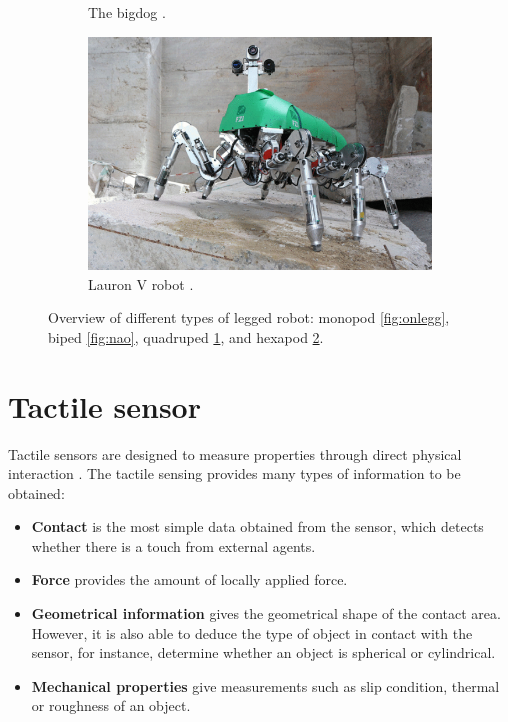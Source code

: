 \documentclass[USenglish]{ifimaster}  %
\begin{document}
\begin{figure}
\begin{subfigure}[b]{0.22\textwidth}
		\caption{The bigdog \cite{Raibert200810822}.}
		\label{fig:bigDog}
	\end{subfigure}\hfill
	\begin{subfigure}[b]{0.22\textwidth}
		\centering
		\includegraphics[width=\linewidth]{Figures/Lauron}
		\caption{Lauron V robot \cite{6878051}.}
		\label{fig:LAURON}
	\end{subfigure}
	\caption[Overview of different types of legged robot]{Overview of different types of legged robot: monopod \ref{fig:onlegg},  biped \ref{fig:nao}, quadruped \ref{fig:bigDog}, and hexapod \ref{fig:LAURON}. }
	\label{fig:robots}
\end{figure}

\FloatBarrier


\section{Tactile sensor}
Tactile sensors are designed to measure properties through direct physical interaction \cite{Cutkosky2008}. The tactile sensing provides many types of information to be obtained:

\begin{itemize}
	\item \textbf{Contact} is the most simple data obtained from the sensor, which detects whether there is a touch from external agents. 
	\item \textbf{Force} provides the amount of locally applied force.
	\item \textbf{Geometrical information} gives the geometrical shape of the contact area. However, it is also able to deduce the type of object in contact with the sensor, for instance, determine whether an object is spherical or cylindrical.
	\item \textbf{Mechanical properties} give measurements such as slip condition, thermal or roughness of an object.
\end{itemize}
\end{document}
